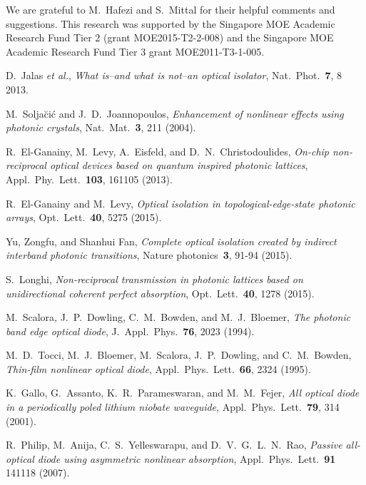 \documentclass[aps,prx,twocolumn,superscriptaddress]{revtex4-1}
\begin{document}
We are grateful to M.~Hafezi and S.~Mittal for their helpful comments and suggestions.  This research was supported by the Singapore MOE Academic Research Fund Tier 2 (grant MOE2015-T2-2-008) and the Singapore MOE Academic Research Fund Tier 3 grant MOE2011-T3-1-005.

\begin{thebibliography}{99}
  D.~Jalas \textit{et al.}, \textit{What is--and what is not--an optical isolator}, Nat.~Phot.~\textbf{7}, 8 2013.

 M.~Solja\u{c}i\'{c} and J.~D.~Joannopoulos,
  \textit{Enhancement of nonlinear effects using photonic crystals},
  Nat.~Mat.~\textbf{3}, 211 (2004).

  R.~El-Ganainy, M.~Levy, A.~Eisfeld, and D.~N.~Christodoulides,
  \textit{On-chip non-reciprocal optical devices based on quantum inspired photonic lattices}, Appl.~Phy.~Lett.~\textbf{103}, 161105 (2013).

  R.~El-Ganainy and M.~Levy, \textit{Optical isolation in topological-edge-state photonic arrays}, Opt.~Lett.~\textbf{40}, 5275 (2015).

Yu, Zongfu, and Shanhui Fan, \textit{Complete optical isolation created by indirect interband photonic transitions}, Nature photonics~\textbf{3}, 91-94 (2015).

  S.~Longhi, \textit{Non-reciprocal transmission in photonic lattices based on unidirectional coherent perfect absorption}, Opt.~Lett.~\textbf{40}, 1278 (2015).

 M.~Scalora, J.~P.~Dowling, C.~M.~Bowden, and M.~J.~Bloemer, \textit{The photonic band edge optical diode}, J.~Appl.~Phys.~\textbf{76}, 2023 (1994).

 M.~D.~Tocci, M.~J.~Bloemer, M.~Scalora, J.~P.~Dowling, and C.~M.~Bowden, \textit{Thin‐film nonlinear optical diode}, Appl.~Phys.~Lett.~\textbf{66}, 2324 (1995).

 K.~Gallo, G.~Assanto, K.~R.~Parameswaran, and M.~M.~Fejer,
  \textit{All optical diode in a periodically poled lithium niobate waveguide},
  Appl.~Phys.~Lett.~\textbf{79}, 314 (2001).

 R.~Philip, M.~Anija, C.~S.~Yelleswarapu, and D.~V.~G.~L.~N.~Rao, \textit{Passive all-optical diode using asymmetric nonlinear absorption}, Appl.~Phys.~Lett.~\textbf{91} 141118 (2007).


\end{thebibliography}
\end{document}
